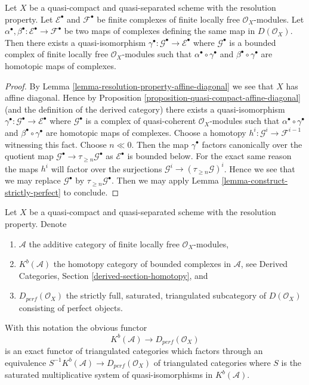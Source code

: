 \begin{lemma}
\label{lemma-resolution-property-homotopy-map-perfect-complex}
Let $X$ be a quasi-compact and quasi-separated scheme with the
resolution property. Let $\mathcal{E}^\bullet$ and $\mathcal{F}^\bullet$
be finite complexes of finite locally free $\mathcal{O}_X$-modules.
Let $\alpha^\bullet, \beta^\bullet :\mathcal{E}^\bullet \to \mathcal{F}^\bullet$
be two maps of complexes defining the same map in $D(\mathcal{O}_X)$.
Then there exists a quasi-isomorphism
$\gamma^\bullet : \mathcal{G}^\bullet \to \mathcal{E}^\bullet$
where $\mathcal{G}^\bullet$ is a bounded complex of finite locally free
$\mathcal{O}_X$-modules
such that $\alpha^\bullet \circ \gamma^\bullet$ and
$\beta^\bullet \circ \gamma^\bullet$ are homotopic maps of complexes.
\end{lemma}

\begin{proof}
By Lemma \ref{lemma-resolution-property-affine-diagonal}
we see that $X$ has affine diagonal. Hence by
Proposition \ref{proposition-quasi-compact-affine-diagonal}
(and the definition of the derived category)
there exists a quasi-isomorphism
$\gamma^\bullet : \mathcal{G}^\bullet \to \mathcal{E}^\bullet$
where $\mathcal{G}^\bullet$ is a complex of quasi-coherent
$\mathcal{O}_X$-modules
such that $\alpha^\bullet \circ \gamma^\bullet$ and
$\beta^\bullet \circ \gamma^\bullet$ are homotopic maps of complexes.
Choose a homotopy $h^i : \mathcal{G}^i \to \mathcal{F}^{i - 1}$
witnessing this fact. Choose $n \ll 0$. Then the map
$\gamma^\bullet$ factors canonically over the quotient
map $\mathcal{G}^\bullet \to \tau_{\geq n}\mathcal{G}^\bullet$
as $\mathcal{E}^\bullet$ is bounded below. For the exact same
reason the maps $h^i$ will factor over the surjections
$\mathcal{G}^i \to (\tau_{\geq n}\mathcal{G})^i$.
Hence we see that we may replace $\mathcal{G}^\bullet$
by $\tau_{\geq n}\mathcal{G}^\bullet$.
Then we may apply Lemma \ref{lemma-construct-strictly-perfect} to conclude.
\end{proof}

\begin{proposition}
\label{proposition-perfect-resolution-property}
Let $X$ be a quasi-compact and quasi-separated scheme with the
resolution property. Denote
\begin{enumerate}
\item $\mathcal{A}$ the additive category of finite locally free
$\mathcal{O}_X$-modules,
\item $K^b(\mathcal{A})$ the homotopy category of bounded complexes
in $\mathcal{A}$, see
Derived Categories, Section \ref{derived-section-homotopy}, and
\item $D_{perf}(\mathcal{O}_X)$ the strictly full, saturated,
triangulated subcategory of $D(\mathcal{O}_X)$ consisting of
perfect objects.
\end{enumerate}
With this notation the obvious functor
$$
K^b(\mathcal{A}) \longrightarrow D_{perf}(\mathcal{O}_X)
$$
is an exact functor of triangulated categories which factors through an
equivalence $S^{-1}K^b(\mathcal{A}) \to D_{perf}(\mathcal{O}_X)$
of triangulated categories
where $S$ is the saturated multiplicative system of quasi-isomorphisms
in $K^b(\mathcal{A})$.
\end{proposition}


